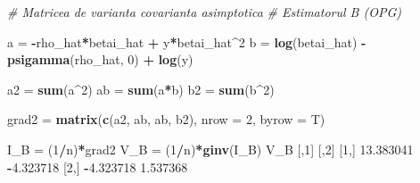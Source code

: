 \documentclass[]{article}
\newenvironment{Shaded}{\begin{snugshade}}{\end{snugshade}}
\newcommand{\KeywordTok}[1]{\textcolor[rgb]{0.13,0.29,0.53}{\textbf{#1}}}
\newcommand{\DataTypeTok}[1]{\textcolor[rgb]{0.13,0.29,0.53}{#1}}
\newcommand{\DecValTok}[1]{\textcolor[rgb]{0.00,0.00,0.81}{#1}}
\newcommand{\FloatTok}[1]{\textcolor[rgb]{0.00,0.00,0.81}{#1}}
\newcommand{\StringTok}[1]{\textcolor[rgb]{0.31,0.60,0.02}{#1}}
\newcommand{\CommentTok}[1]{\textcolor[rgb]{0.56,0.35,0.01}{\textit{#1}}}
\newcommand{\OperatorTok}[1]{\textcolor[rgb]{0.81,0.36,0.00}{\textbf{#1}}}
\newcommand{\NormalTok}[1]{#1}
\begin{document}
\begin{Shaded}
\begin{Highlighting}[]
\CommentTok{# Matricea de varianta covarianta asimptotica }
\CommentTok{# Estimatorul B (OPG)}

\NormalTok{a =}\StringTok{ }\OperatorTok{-}\NormalTok{rho_hat}\OperatorTok{*}\NormalTok{betai_hat }\OperatorTok{+}\StringTok{ }\NormalTok{y}\OperatorTok{*}\NormalTok{betai_hat}\OperatorTok{^}\DecValTok{2}
\NormalTok{b =}\StringTok{  }\KeywordTok{log}\NormalTok{(betai_hat) }\OperatorTok{-}\StringTok{ }\KeywordTok{psigamma}\NormalTok{(rho_hat, }\DecValTok{0}\NormalTok{) }\OperatorTok{+}\StringTok{ }\KeywordTok{log}\NormalTok{(y)}

\NormalTok{a2 =}\StringTok{ }\KeywordTok{sum}\NormalTok{(a}\OperatorTok{^}\DecValTok{2}\NormalTok{)}
\NormalTok{ab =}\StringTok{ }\KeywordTok{sum}\NormalTok{(a}\OperatorTok{*}\NormalTok{b)}
\NormalTok{b2 =}\StringTok{ }\KeywordTok{sum}\NormalTok{(b}\OperatorTok{^}\DecValTok{2}\NormalTok{)}

\NormalTok{grad2 =}\StringTok{ }\KeywordTok{matrix}\NormalTok{(}\KeywordTok{c}\NormalTok{(a2, ab, ab, b2), }\DataTypeTok{nrow =} \DecValTok{2}\NormalTok{, }\DataTypeTok{byrow =}\NormalTok{ T)}

\NormalTok{I_B =}\StringTok{ }\NormalTok{(}\DecValTok{1}\OperatorTok{/}\NormalTok{n)}\OperatorTok{*}\NormalTok{grad2}
\NormalTok{V_B =}\StringTok{ }\NormalTok{(}\DecValTok{1}\OperatorTok{/}\NormalTok{n)}\OperatorTok{*}\KeywordTok{ginv}\NormalTok{(I_B)}
\NormalTok{V_B}
\NormalTok{          [,}\DecValTok{1}\NormalTok{]      [,}\DecValTok{2}\NormalTok{]}
\NormalTok{[}\DecValTok{1}\NormalTok{,] }\FloatTok{13.383041} \OperatorTok{-}\FloatTok{4.323718}
\NormalTok{[}\DecValTok{2}\NormalTok{,] }\OperatorTok{-}\FloatTok{4.323718}  \FloatTok{1.537368}
\end{Highlighting}
\end{Shaded}
\end{document}
